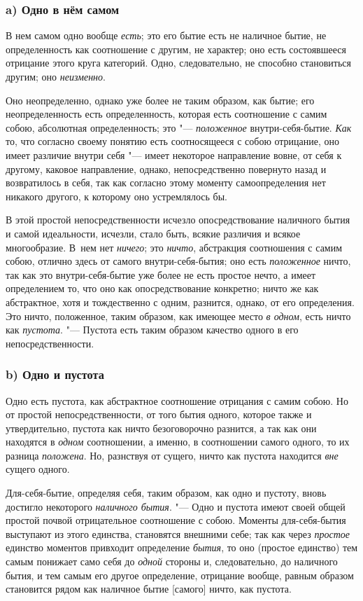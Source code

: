 \subsubsection[a) Одно в нём самом]{a) Одно в нём самом}
В нем самом одно вообще {\em есть}; это его бытие есть
не наличное бытие, не определенность как соотношение с другим, не характер;
оно есть состоявшееся отрицание этого круга категорий. Одно, следовательно,
не способно становиться другим; оно {\em неизменно}.

Оно неопределенно, однако уже более не таким образом, как бытие; его
неопределенность есть определенность, которая есть соотношение с самим
собою, абсолютная определенность; это
"--- {\em положенное} внутри-себя-бытие.
{\em Как} то, что согласно своему понятию есть
соотносящееся с собою отрицание, оно имеет различие внутри себя "--- имеет
некоторое направление вовне, от себя к другому, каковое направление,
однако, непосредственно повернуто назад и возвратилось в себя, так как
согласно этому моменту самоопределения нет никакого другого, к которому оно
устремлялось бы.

В этой простой непосредственности исчезло опосредствование наличного бытия и
самой идеальности, исчезли, стало быть, всякие различия и всякое
многообразие. В~нем нет {\em ничего}; это
{\em ничто}, абстракция соотношения с самим собою,
отлично здесь от самого внутри-себя-бытия; оно есть
{\em положенное} ничто, так как это внутри-себя-бытие
уже более не есть простое нечто, а имеет определением то, что оно как
опосредствование конкретно; ничто же как абстрактное, хотя и тождественно с
одним, разнится, однако, от его определения. Это ничто, положенное, таким
образом, как имеющее место {\em в одном}, есть ничто
как {\em пустота}. "--- Пустота есть таким образом
качество одного в его непосредственности.

\subsubsection[b) Одно и пустота]{b) Одно и пустота}
Одно есть пустота, как абстрактное соотношение отрицания с самим собою. Но
от простой непосредственности, от того бытия одного, которое также и
утвердительно, пустота как ничто безоговорочно разнится, а так как они
находятся в {\em одном} соотношении, а именно, в
соотношении самого одного, то их разница
{\em положена}. Но, разнствуя от сущего, ничто как
пустота находится {\em вне} сущего одного.

Для-себя-бытие, определяя себя, таким образом, как одно и пустоту, вновь
достигло некоторого {\em наличного бытия}. "--- Одно и
пустота имеют своей общей простой почвой отрицательное соотношение с собою.
Моменты для-себя-бытия выступают из этого единства, становятся внешними
себе; так как через {\em простое} единство моментов
привходит определение {\em бытия}, то оно (простое
единство) тем самым понижает само себя до {\em одной}
стороны и, следовательно, до наличного бытия, и тем самым его другое
определение, отрицание вообще, равным образом становится рядом как наличное
бытие [самого] ничто, как пустота.

